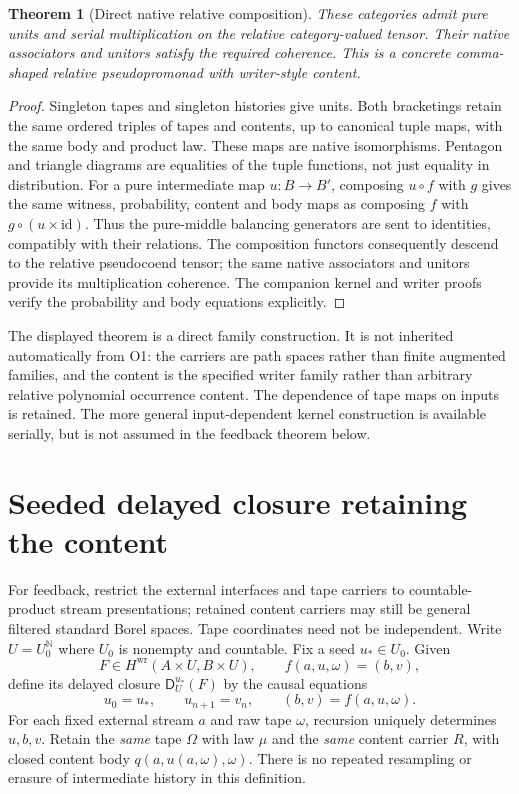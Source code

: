 \documentclass[11pt]{article}
\newtheorem{theorem}{Theorem}[section]
\begin{document}
\begin{theorem}[Direct native relative composition]
These categories admit pure units and serial multiplication on the relative category-valued tensor. Their native associators and unitors satisfy the required coherence. This is a concrete comma-shaped relative pseudopromonad with writer-style content.
\end{theorem}
\begin{proof}
Singleton tapes and singleton histories give units. Both bracketings retain the same ordered triples of tapes and contents, up to canonical tuple maps, with the same body and product law. These maps are native isomorphisms. Pentagon and triangle diagrams are equalities of the tuple functions, not just equality in distribution. For a pure intermediate map $u:B\to B'$, composing $u\circ f$ with $g$ gives the same witness, probability, content and body maps as composing $f$ with $g\circ(u\times\mathrm{id})$. Thus the pure-middle balancing generators are sent to identities, compatibly with their relations. The composition functors consequently descend to the relative pseudocoend tensor; the same native associators and unitors provide its multiplication coherence. The companion kernel and writer proofs verify the probability and body equations explicitly.
\end{proof}
The displayed theorem is a direct family construction. It is not inherited automatically from O1: the carriers are path spaces rather than finite augmented families, and the content is the specified writer family rather than arbitrary relative polynomial occurrence content. The dependence of tape maps on inputs is retained. The more general input-dependent kernel construction is available serially, but is not assumed in the feedback theorem below.

\section{Seeded delayed closure retaining the content}
For feedback, restrict the external interfaces and tape carriers to countable-product stream presentations; retained content carriers may still be general filtered standard Borel spaces. Tape coordinates need not be independent. Write $U=U_0^{\mathbb N}$ where $U_0$ is nonempty and countable. Fix a seed $u_*\in U_0$. Given
\[
 F\in H^{\mathrm{wr}}(A\times U,B\times U),\qquad
 f(a,u,\omega)=(b,v),
\]
define its delayed closure $\mathsf D_U^{u_*}(F)$ by the causal equations
\[
 u_0=u_*,\qquad u_{n+1}=v_n,\qquad (b,v)=f(a,u,\omega).
\tag{D}
\]
For each fixed external stream $a$ and raw tape $\omega$, recursion uniquely determines $u,b,v$. Retain the \emph{same} tape $\Omega$ with law $\mu$ and the \emph{same} content carrier $R$, with closed content body $q(a,u(a,\omega),\omega)$. There is no repeated resampling or erasure of intermediate history in this definition.
\end{document}
